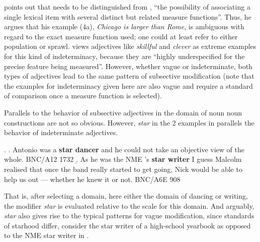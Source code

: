 \citet[6]{Kennedy:2007} points out that  needs to be distinguished from
, ``the possibility of associating a single lexical item with
several distinct but related measure functions''. Thus, he argues that his example (4a),
\emph{Chicago is larger than Rome}, is ambiguous with regard to the exact
measure function used; one could at least refer to either population or
sprawl. \citet[6]{Kennedy:2007} views adjectives like \emph{skillful} and
\emph{clever} as extreme examples for this kind of indeterminacy, because
they are ``highly underspecified for the precise feature being
measured''. However, whether vague or indeterminate, both types of
adjectives lead to the same pattern of subsective modification (note
that the examples for indeterminacy given here are also vague and require a standard of comparison once a measure function is selected). 

Parallels to the behavior of subsective adjectives in the domain of
noun noun
constructions are not so obvious. However, \emph{star} in the 2
examples in \Next parallels the behavior of indeterminate adjectives. 

\ex. %
\a. Antonio was a \textbf{star dancer} and he could not take an objective view
of the whole. BNC/A12 1732 	
\b.   	As he was the NME 's \textbf{star writer} I guess Malcolm realised that
once the band really started to get going, Nick would be able to help
us out — whether he knew it or not. BNC/A6E 908

That is, after selecting a domain, here either the domain of dancing
or writing, the modifier \emph{star} is evaluated relative to the
scale for this domain. And arguably, \emph{star} also gives rise to the
typical patterns for vague modification, since standards of starhood
differ, consider the star writer of a high-school yearbook as opposed
to the NME star writer in \Last[b].


